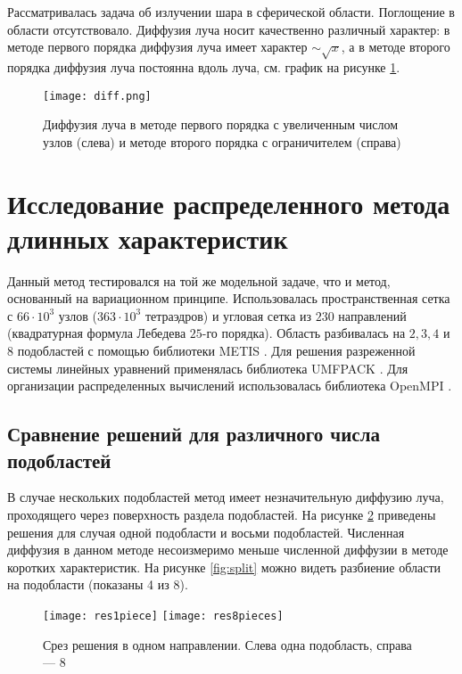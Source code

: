Рассматривалась задача об излучении шара в сферической области. Поглощение в области отсутствовало. Диффузия луча носит качественно различный характер: в методе первого порядка диффузия луча имеет характер $\sim \sqrt{x}$, а в методе второго порядка диффузия луча постоянна вдоль луча, см. график на рисунке \ref{fig:diffus}.

\begin{figure}[ht!]
\centering
\texttt{[image: diff.png]}
\caption{Диффузия луча в методе первого порядка с увеличенным числом узлов (слева) и методе второго порядка с ограничителем (справа)}
\label{fig:diffus}
\end{figure}

\section{Исследование распределенного метода длинных характеристик}

Данный метод тестировался на той же модельной задаче, что и метод, основанный на вариационном принципе. Использовалась пространственная сетка с $66 \cdot 10^{3}$ узлов ($363 \cdot 10^{3}$ тетраэдров) и угловая сетка из $230$ направлений (квадратурная формула Лебедева $25$-го порядка). Область разбивалась на $2, 3, 4$ и $8$ подобластей с помощью библиотеки METIS \cite{METIS}.  Для решения разреженной системы линейных уравнений применялась библиотека UMFPACK \cite{umfpack2004}. Для организации распределенных вычислений использовалась библиотека OpenMPI \cite{MPI}.

\subsection{Сравнение решений для различного числа подобластей}

В случае нескольких подобластей метод имеет незначительную диффузию луча, проходящего через поверхность раздела подобластей.
На рисунке \ref{fig:diff} приведены решения для случая одной подобласти и восьми подобластей. Численная диффузия в данном методе несоизмеримо меньше численной диффузии в методе коротких характеристик.
На рисунке \ref{fig:split} можно видеть разбиение области на подобласти (показаны 4 из 8).

\begin{figure}[ht!]
\texttt{[image: res1piece]}
\texttt{[image: res8pieces]}
\caption{Срез решения в одном направлении. Слева одна подобласть, справа --- 8}
\label{fig:diff}
\end{figure}

